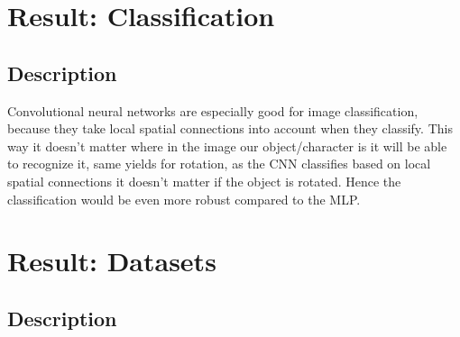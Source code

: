 \documentclass[Report.tex]{subfiles}
\begin{document}
\section{Result: Classification}

\subsection{Description}
\begin{flushleft}
  Convolutional neural networks are especially good for image
  classification, because they take local spatial connections into account when
  they classify. This way it doesn't matter where in the image our
  object/character is it will be able to recognize it, same yields for rotation,
  as the CNN classifies based on local spatial connections it doesn't matter if
  the object is rotated. Hence the classification would be even more robust
  compared to the MLP.
\end{flushleft}

\section{Result: Datasets}
\subsection{Description}
\end{document}
